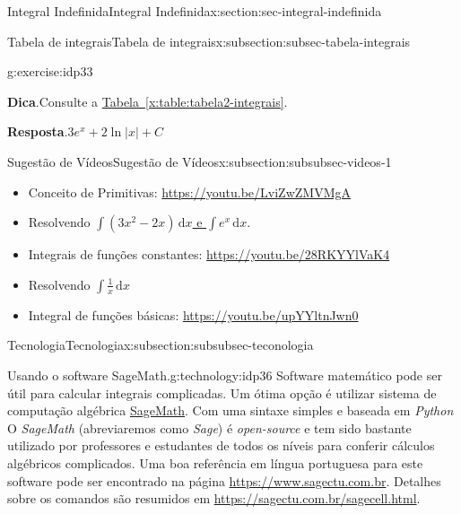 \documentclass[oneside,10pt,]{article}
\newcommand{\blocktitlefont}{\relax}
\newcommand{\xreffont}{\relax}
\numberwithin{equation}{section}
\newcommand{\dd}{\mathrm{d}}
\newcommand{\integral}[2]{\displaystyle\int {#1}\,\dd {#2}}
\begin{document}
\begin{sectionptx}{Integral Indefinida}{}{Integral Indefinida}{}{}{x:section:sec-integral-indefinida}
\begin{subsectionptx}{Tabela de integrais}{}{Tabela de integrais}{}{}{x:subsection:subsec-tabela-integrais}
\begin{inlineexercise}{}{g:exercise:idp33}
\par\smallskip%
\noindent\textbf{\blocktitlefont Dica}.\hypertarget{g:hint:idp34}{}\quad{}Consulte a \hyperref[x:table:tabela2-integrais]{Tabela~{\xreffont\ref{x:table:tabela2-integrais}}}.%
\par\smallskip%
\noindent\textbf{\blocktitlefont Resposta}.\hypertarget{g:answer:idp35}{}\quad{}\(3 e^{x} + 2 \ln{|x|} + C\)%
\end{inlineexercise}%
\end{subsectionptx}
%
%
\typeout{************************************************}
\typeout{************************************************}
%
\begin{subsectionptx}{Sugestão de Vídeos}{}{Sugestão de Vídeos}{}{}{x:subsection:subsubsec-videos-1}
%
\begin{itemize}[label=\textbullet]
\item{}Conceito de Primitivas: \url{https://youtu.be/LviZwZMVMgA}%
\item{}Resolvendo \href{https://youtu.be/f1epDo4u7bE}{\(\integral{(3x^2 - 2x)}{x}\) e \(\integral{e^x}{x}.\)}%
\item{}Integrais de funções constantes: \url{https://youtu.be/28RKYYlVaK4}%
\item{}Resolvendo \href{https://youtu.be/bcD4aFioMFI}{\(\integral{\frac{1}{x}}{x}\)}%
\item{}Integral de funções básicas:  \url{https://youtu.be/upYYltnJwn0}%
\end{itemize}
\end{subsectionptx}
%
%
\typeout{************************************************}
\typeout{************************************************}
%
\begin{subsectionptx}{Tecnologia}{}{Tecnologia}{}{}{x:subsection:subsubsec-teconologia}
\begin{technology}{Usando o software SageMath.}{g:technology:idp36}%
Software matemático pode ser útil para calcular  integrais complicadas. Um ótima opção é utilizar sistema de computação algébrica  \href{https://www.sagemath.org}{SageMath}. Com uma sintaxe simples e baseada em \emph{Python}\footnotemark{} O \emph{SageMath} (abreviaremos como \emph{Sage}) é \emph{open-source} \footnotemark{} e tem sido bastante utilizado por professores e  estudantes de todos os níveis para conferir cálculos algébricos complicados. Uma boa referência em língua portuguesa para este software pode ser encontrado na página  \url{https://www.sagectu.com.br}. Detalhes sobre os comandos são resumidos em \url{https://sagectu.com.br/sagecell.html}.%

\end{technology}
\end{subsectionptx}
\end{sectionptx}
\end{document}
